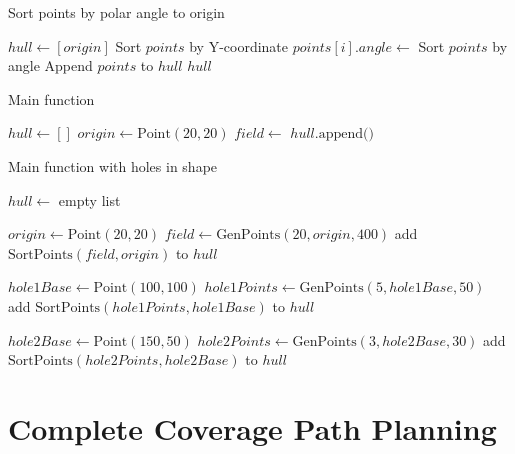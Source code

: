 \documentclass[final]{cmpreport_02}
\begin{document}
\begin{algorithm}[h!]
	\caption{Sort points by polar angle to origin}
	\label{mg:sortPoints}
	\begin{algorithmic}[1]
		\State $hull \gets [origin]$
		\State Sort $points$ by Y-coordinate
		\State $points[i].angle \gets$ 
		\EndFor
		\State Sort $points$ by angle
		\State Append $points$ to $hull$
		\State \Return $hull$
		\EndFunction
	\end{algorithmic}
\end{algorithm}

\begin{algorithm}[h!]
	\caption{Main function}
	\label{mg:main}
	\begin{algorithmic}[1]
		\State $hull \gets []$
		\State $origin \gets \text{Point}(20, 20)$
		\State $field \gets$ 
		\State $hull.\text{append}($$)$
		\EndFunction
	\end{algorithmic}
\end{algorithm}

\begin{algorithm}[h!]
	\caption{Main function with holes in shape}
	\label{mg:mainWithHoles}
	\begin{algorithmic}[1]
		\State $hull \gets$ empty list

		\State $origin \gets \text{Point}(20, 20)$
		\State $field \gets \text{GenPoints}(20, origin, 400)$
		\State add $\text{SortPoints}(field, origin)$ to $hull$

		\State $hole1Base \gets \text{Point}(100, 100)$
		\State $hole1Points \gets \text{GenPoints}(5, hole1Base, 50)$
		\State add $\text{SortPoints}(hole1Points, hole1Base)$ to $hull$

		\State $hole2Base \gets \text{Point}(150, 50)$
		\State $hole2Points \gets \text{GenPoints}(3, hole2Base, 30)$
		\State add $\text{SortPoints}(hole2Points, hole2Base)$ to $hull$
		\EndProcedure
	\end{algorithmic}
\end{algorithm}

\clearpage
\section{Complete Coverage Path Planning}
\end{document}
